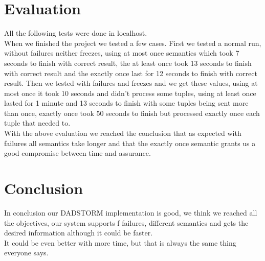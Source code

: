 \documentclass[times, 10pt, twocolumn]{article}
\begin{document}
\section{Evaluation}
All the following tests were done in localhost.
\\When we finished the project we tested a few cases. First we tested a normal run, without failures neither freezes, using at most once semantics which took 7 seconds to finish with correct result, the at least once took 13 seconds to finish with correct result and the exactly once last for 12 seconds to finish with correct result. Then we tested with failures and freezes and we get these values, using at most once it took 10 seconds and didn't process some tuples, using at least once lasted for 1 minute and 13 seconds to finish with some tuples being sent more than once, exactly once took 50 seconds to finish but processed exactly once each tuple that needed to.
\\With the above evaluation we reached the conclusion that as expected with failures all semantics take longer and that the exactly once semantic grants us a good compromise between time and assurance.





\section{Conclusion}
In conclusion our DADSTORM implementation is good, we think we reached all the objectives, our system supports f failures, different semantics and gets the desired information although it could be faster.
\\It could be even better with more time, but that is always the same thing everyone says.
\end{document}
